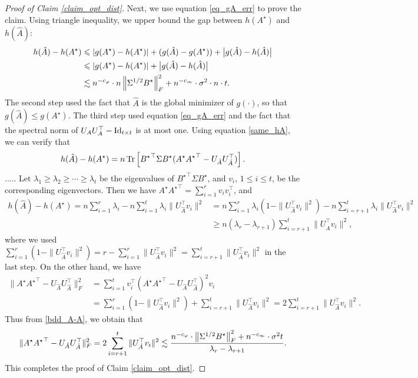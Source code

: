 \begin{proof}[Proof of Claim \ref{claim_opt_dist}]
	\bigskip
	Next, we use equation \eqref{eq_gA_err} to prove the claim.
	Using triangle inequality, we upper bound the gap between $h(A^{\star})$ and $h(\hat{A})$:
	\begin{align}
		h(\hat{A})- h(A^{\star})   &\leqslant {\left| {g(A^{\star}) - h(A^{\star})} \right|} + (g(\hat A) - g({A}^{\star})) + \big|g(\hat{A}) - h(\hat{A})\big| \nonumber \\
		&\leqslant {\left| {g(A^{\star}) - h(A^{\star})} \right|}  + \big|g(\hat{A}) - h(\hat{A})\big|\nonumber \\
		&\lesssim n^{-c_\varphi}\cdot n \left\| \Sigma^{1/2} B^{\star} \right\|_{F}^2 + n^{-c_\infty}\cdot \sigma^2 \cdot n \cdot t. \label{eq_g_gap}
	\end{align}
	The second step used the fact that $\hat A$ is the global minimizer of $g(\cdot)$, so that $g(\hat A) \le g({A}^\star)$.
	The third step used equation \eqref{eq_gA_err} and the fact that the spectral norm of $U_A U_A^{\top} - \operatorname{Id}_{t\times t}$ is at most one. 
	Using equation \eqref{same_hA}, we can verify that
	$$h(\hat A)-h(A^\star) = n \operatorname{Tr}\left[{B^\star}^\top\Sigma B^\star ( A^\star {A^\star}^\top -U_{\hat A}U^\top_{\hat A})\right] .$$
	..... Let $\lambda_1\ge\lambda_2 \ge \cdots\ge \lambda_t$ be the eigenvalues of ${B^\star}^\top\Sigma B^\star$, and $v_i$, $1\le i \le t$, be the corresponding eigenvectors. Then we have $A^\star {A^\star}^\top =\sum_{i=1}^r v_i v_i^\top$, and 
	\begin{align}
	h(\hat A)-h(A^\star) = n \sum_{i=1}^r \lambda_i - n\sum_{i=1}^t \lambda_i \| U^\top_{\hat A} v_i\|^2 &= n\sum_{i=1}^r \lambda_i\left(1 -  \| U^\top_{\hat A} v_i\|^2\right)-n\sum_{i=r+1}^t \lambda_i \| U^\top_{\hat A} v_i\|^2 \nonumber\\
	&\ge  n(\lambda_r-\lambda_{r+1}) \sum_{i=r+1}^t \| U^\top_{\hat A} v_i\|^2 , \label{bdd_A-A}
	\end{align}
	where we used $\sum_{i=1}^r \left(1 -  \| U^\top_{\hat A} v_i\|^2\right) = r- \sum_{i=1}^r  \| U^\top_{\hat A} v_i\|^2 =\sum_{i=r+1}^t \| U^\top_{\hat A} v_i\|^2  $ in the last step. On the other hand, we have 
	\begin{align*}
	\| A^\star {A^\star}^\top -U_{\hat A}U^\top_{\hat A}\|_F^2 & =\sum_{i=1}^t v_i^\top (A^\star {A^\star}^\top -U_{\hat A}U^\top_{\hat A})^2 v_i \\
	& =\sum_{i=1}^r \left(1 -  \| U^\top_{\hat A} v_i\|^2\right) + \sum_{i=r+1}^t \| U^\top_{\hat A} v_i\|^2 =2 \sum_{i=r+1}^t \| U^\top_{\hat A} v_i\|^2.
	\end{align*}
	Thus from \eqref{bdd_A-A}, we obtain that 
	$$\| A^\star {A^\star}^\top -U_{\hat A}U^\top_{\hat A}\|_F^2  =2 \sum_{i=r+1}^t \| U^\top_{\hat A} v_i\|^2 \lesssim \frac{n^{-c_\varphi}\cdot  \left\| \Sigma^{1/2} B^{\star} \right\|_{F}^2 + n^{-c_\infty}\cdot \sigma^2 t}{\lambda_r- \lambda_{r+1}}.$$
	This completes the proof of Claim \ref{claim_opt_dist}.
	\end{proof}
	
